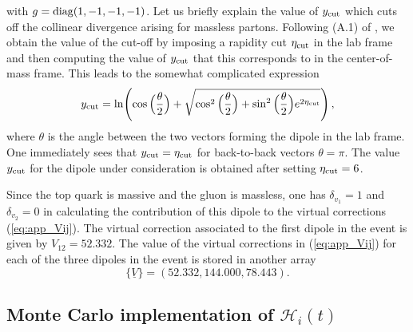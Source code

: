 \documentclass[11pt,a4paper]{article}
\begin{document}
with $g={\rm diag}(1,-1,-1,-1)$.
Let us briefly explain the value of $y_{{\rm cut}}$ which cuts off the collinear divergence arising for massless partons. Following (A.1) of \cite{Balsiger:2018ezi}, we obtain the value of the cut-off by imposing a rapidity cut  $\eta_{\rm cut}$ in the lab frame and then computing the value of $y_{{\rm cut}}$ that this corresponds to in the center-of-mass frame. This leads to the somewhat complicated expression
\begin{equation}\label{eq:cutoff}
y_{{\rm cut}} = \ln\! \left(\cos\Big(\frac{\theta }{2}\Big) + \sqrt{\cos^2\Big(\frac{\theta }{2}\Big) + \sin^2\Big(\frac{\theta}{2}\Big) e^{2 \eta_{{\rm cut}}}}\right),
\end{equation}
where $\theta$ is the angle between the two vectors forming the dipole in the lab frame. One immediately sees that $y_{{\rm cut}}=\eta_{{\rm cut}}$ for back-to-back vectors $\theta=\pi$.
The value $y_{{\rm cut}}$ for the dipole under consideration is obtained after setting $\eta_{{\rm cut}}=6$.

Since  the top quark is massive and the gluon is massless, one has $\delta_{v_1}=1$ and $\delta_{v_2}=0$ in calculating the contribution of this dipole to the virtual corrections (\ref{eq:app_Vij}). The virtual correction associated to the first dipole in the event is given by $V_{12}=52.332$. The value of the virtual corrections in (\ref{eq:app_Vij}) for each of the three dipoles in the event is stored in another array 
\begin{equation}
\{\underline{V} \}=\left(52.332,144.000,78.443\right).
\end{equation}




\subsection{Monte Carlo implementation of $\mathcal{H}_i(t)$}\label{sec:app_startShower}
\end{document}
